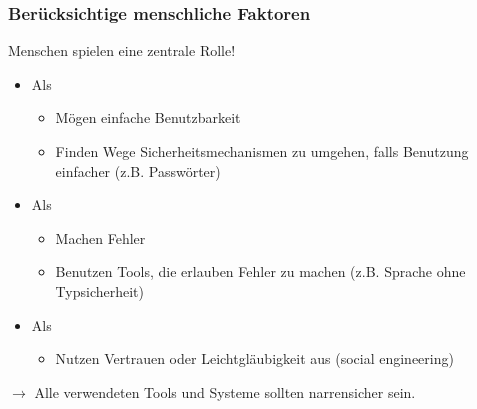\subsubsection*{Berücksichtige menschliche Faktoren}
Menschen spielen eine zentrale Rolle!
\begin{itemize}
    \item Als 
    \begin{itemize}
        \item Mögen einfache Benutzbarkeit
        \item Finden Wege Sicherheitsmechanismen zu umgehen, falls Benutzung einfacher (z.B. Passwörter)
    \end{itemize}
    \item Als 
    \begin{itemize}
        \item Machen Fehler
        \item Benutzen Tools, die erlauben Fehler zu machen (z.B. Sprache ohne Typsicherheit)
    \end{itemize}
    \item Als 
    \begin{itemize}
        \item Nutzen Vertrauen oder Leichtgläubigkeit aus (social engineering)
    \end{itemize}
\end{itemize}
$\rightarrow$ Alle verwendeten Tools und Systeme sollten narrensicher sein.
